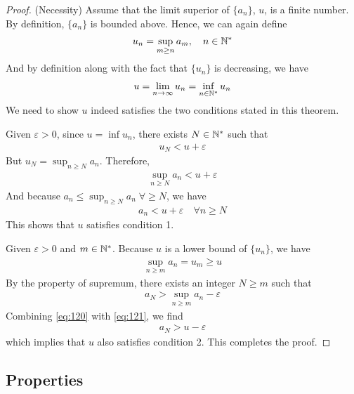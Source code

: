 \documentclass[thmcnt=section, 12pt]{my-elegantbook}
\begin{document}
\begin{proof}
    (Necessity) Assume that the limit superior of $\{a_n\}$, $u$, is a finite number. By definition, $\{a_n\}$ is bounded above. Hence, we can again define
    \begin{align*}
        u_n = \sup_{m \geq n} a_m,
        \quad n \in \mathbb{N}^\ast
    \end{align*}
    And by definition along with the fact that $\{u_n\}$ is decreasing, we have
    \begin{align*}
        u = \lim_{n \to \infty} u_n
        = \inf_{n \in \mathbb{N}^\ast} u_n
    \end{align*}
    We need to show $u$ indeed satisfies the two conditions stated in this theorem.

    Given $\varepsilon > 0$, since $u = \inf u_n$, there exists $N \in \mathbb{N}^\ast$ such that
    \begin{align*}
        u_N < u + \varepsilon
    \end{align*}
    But $u_N = \sup_{n \geq N} a_n$. Therefore,
    \begin{align*}
        \sup_{n \geq N} a_n < u + \varepsilon
    \end{align*}
    And because $a_n \leq \sup_{n \geq N} a_n \; \forall \geq N$, we have
    \begin{align*}
        a_n < u + \varepsilon
        \quad \forall n \geq N
    \end{align*}
    This shows that $u$ satisfies condition 1.

    Given $\varepsilon > 0$ and $m \in \mathbb{N}^\ast$. Because $u$ is a lower bound of $\{u_n\}$, we have
    \begin{align}
        \sup_{n \geq m} a_n = u_m \geq u
        \label{eq:120}
    \end{align}
    By the property of supremum, there exists an integer $N \geq m$ such that
    \begin{align}
        a_N > \sup_{n \geq m} a_n - \varepsilon
        \label{eq:121}
    \end{align}
    Combining \eqref{eq:120} with \eqref{eq:121}, we find
    \begin{align*}
        a_N > u - \varepsilon
    \end{align*}
    which implies that $u$ also satisfies condition 2. This completes the proof.
\end{proof}


\subsection{Properties}
\end{document}
